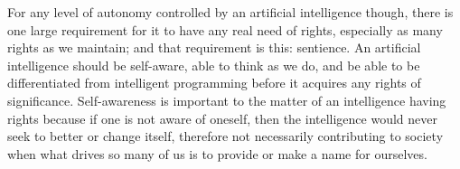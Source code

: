 For any level of autonomy controlled by an artificial intelligence though, there is one large requirement for it to have any real need of rights, especially as many rights as we maintain; and that requirement is this: sentience. An artificial intelligence should be self-aware, able to think as we do, and be able to be differentiated from intelligent programming before it acquires any rights of significance. Self-awareness is important to the matter of an intelligence having rights because if one is not aware of oneself, then the intelligence would never seek to better or change itself, therefore not necessarily contributing to society when what drives so many of us is to provide or make a name for ourselves.